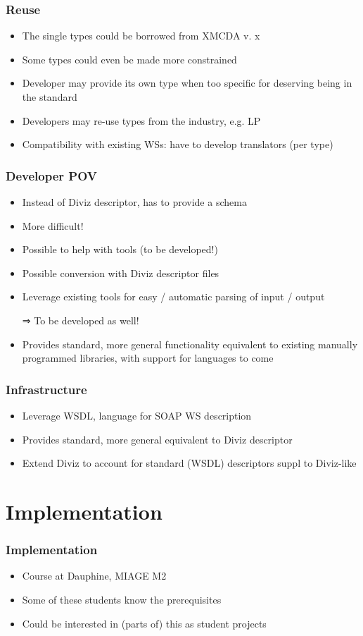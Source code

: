 \documentclass[french,english]{beamer}
\begin{document}
\begin{frame}
	\frametitle{Reuse}
	\begin{itemize}
		\item The single types could be borrowed from XMCDA v. x
		\item Some types could even be made more constrained
		\item Developer may provide its own type when too specific for deserving being in the standard
		\item Developers may re-use types from the industry, e.g. LP
		\item Compatibility with existing \acp{WS}: have to develop translators (per type)
	\end{itemize}
\end{frame}

\begin{frame}
	\frametitle{Developer POV}
	\begin{itemize}
		\item Instead of Diviz descriptor, has to provide a schema
		\item More difficult!
		\item Possible to help with tools (to be developed!)
		\item Possible conversion with Diviz descriptor files
		\item Leverage existing tools for easy / automatic parsing of input / output
		\item[⇒] To be developed as well!
		\item Provides standard, more general functionality equivalent to existing manually programmed libraries, with support for languages to come
	\end{itemize}
\end{frame}

\begin{frame}
	\frametitle{Infrastructure}
	\begin{itemize}
		\item Leverage WSDL, language for SOAP WS description
		\item Provides standard, more general equivalent to Diviz descriptor
		\item Extend Diviz to account for standard (WSDL) descriptors suppl to Diviz-like
	\end{itemize}
\end{frame}

\section{Implementation}
\begin{frame}
	\frametitle{Implementation}
	\begin{itemize}
		\item Course at Dauphine, MIAGE M2
		\item Some of these students know the prerequisites
		\item Could be interested in (parts of) this as student projects
	\end{itemize}
\end{frame}
\end{document}

